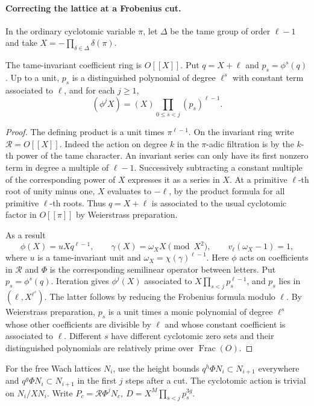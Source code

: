 \paragraph{Correcting the lattice at a Frobenius cut.}\label{par:wach-cut-correction}
In the ordinary cyclotomic variable \(\pi\), let \(\Delta\)
be the tame group of order \(\ell-1\) and take
\(X=-\prod_{\delta\in\Delta}\delta(\pi)\).
\begin{lemma}
The tame-invariant coefficient ring is \(O[[X]]\). Put \(q=X+\ell\)
and \(p_s=\phi^s(q)\). Up to a unit, \(p_s\) is a distinguished
polynomial of degree \(\ell^s\) with constant term associated to
\(\ell\), and for each \(j\ge1\),
\[
 (\phi^j X)=(X)\prod_{0\le s<j}(p_s)^{\ell-1}.
\]
\end{lemma}
\begin{proof}
The defining product is a unit times \(\pi^{\ell-1}\). On the invariant ring
write \(\mathcal R=O[[X]]\). Indeed the action on degree \(k\) in the \(\pi\)-adic
filtration is by the \(k\)-th power of the tame character.
An invariant series can only have its first nonzero term in
degree a multiple of \(\ell-1\). Successively subtracting
a constant multiple of the corresponding power of \(X\)
expresses it as a series in \(X\).
At a primitive \(\ell\)-th root of unity minus one,
\(X\) evaluates to \(-\ell\), by the product formula for
all primitive \(\ell\)-th roots. Thus \(q=X+\ell\) is
associated to the usual cyclotomic factor in \(O[[\pi]]\)
by Weierstrass preparation.

As a result
\[
 \phi(X)=uXq^{\ell-1},\qquad
 \gamma(X)=\omega_X X\pmod{X^2},\qquad
 v_\ell(\omega_X-1)=1 ,
\]
where \(u\) is a tame-invariant unit and
\(\omega_X=\chi(\gamma)^{\ell-1}\).
Here \(\phi\) acts on coefficients in
\(\mathcal R\) and \(\Phi\) is the corresponding semilinear operator
between letters. Put \(p_s=\phi^s(q)\). Iteration gives
\(\phi^j(X)\) associated to \(X\prod_{s<j}p_s^{\ell-1}\), and
\(p_s\) lies in \((\ell,X^{\ell^s})\). The latter follows by
reducing the Frobenius formula modulo \(\ell\). By Weierstrass
preparation, \(p_s\) is a unit times a monic polynomial of degree
\(\ell^s\) whose other coefficients are divisible by \(\ell\)
and whose constant coefficient is associated to \(\ell\).
Different \(s\) have different cyclotomic zero sets and their
distinguished polynomials are relatively prime over
\(\operatorname{Frac}(O)\).

\end{proof}
For the free Wach lattices \(N_i\), use the height bounds
\(q^h\Phi N_i\subset N_{i+1}\) everywhere and
\(q^g\Phi N_i\subset N_{i+1}\) in the first \(j\) steps after a
cut. The cyclotomic action is trivial on \(N_i/XN_i\). Write
\(P_c=\mathcal R\Phi^j N_c,\ D=X^M\prod_{s<j}p_s^{3g}\).

